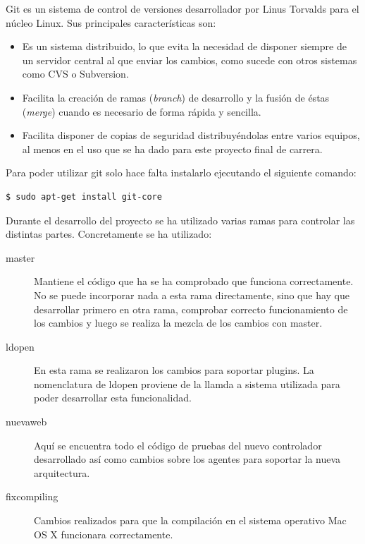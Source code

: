 Git es un sistema de control de versiones desarrollador por Linus Torvalds para el núcleo Linux. Sus principales características son:

\begin{itemize}
	\item Es un sistema distribuido, lo que evita la necesidad de disponer siempre de un servidor central al que enviar los cambios, como sucede con otros sistemas como CVS o Subversion.
	
	\item Facilita la creación de ramas (\emph{branch}) de desarrollo y la fusión de éstas (\emph{merge}) cuando es necesario de forma rápida y sencilla.
	
	\item Facilita disponer de copias de seguridad distribuyéndolas entre varios equipos, al menos en el uso que se ha dado para este proyecto final de carrera.
\end{itemize}

Para poder utilizar git solo hace falta instalarlo ejecutando el siguiente comando:

\begin{verbatim}
$ sudo apt-get install git-core
\end{verbatim}

Durante el desarrollo del proyecto se ha utilizado varias ramas para controlar las distintas partes. Concretamente se ha utilizado:

\begin{description}
	\item[master] Mantiene el código que ha se ha comprobado que funciona correctamente. No se puede incorporar nada a esta rama directamente, sino que hay que desarrollar primero en otra rama, comprobar correcto funcionamiento de los cambios y luego se realiza la mezcla de los cambios con master.
	
	\item[ldopen] En esta rama se realizaron los cambios para soportar plugins. La nomenclatura de ldopen proviene de la llamda a sistema utilizada para poder desarrollar esta funcionalidad.
	
	\item[nuevaweb] Aquí se encuentra todo el código de pruebas del nuevo controlador desarrollado así como cambios sobre los agentes para soportar la nueva arquitectura.
	
	\item[fixcompiling] Cambios realizados para que la compilación en el sistema operativo Mac OS X funcionara correctamente.
\end{description}

